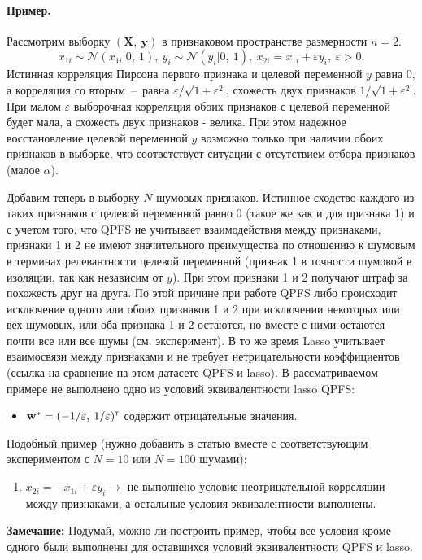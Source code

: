 \documentclass[12pt, a4paper]{article}
\newcommand{\T}{{\text{\tiny\sffamily\upshape\mdseries T}}}
\newcommand{\xmatr}{\mathbf{X}}
\newcommand{\norm}{\mathcal{N}}
\newcommand{\yvec}{\mathbf{y}}
\newcommand{\wvec}{\mathbf{w}}
\begin{document}
\paragraph*{Пример.} Рассмотрим выборку $(\xmatr, \:\yvec)$ в признаковом пространстве размерности $n=2$. 
\begin{equation}
\label{eq:sample_2features}
x_{1i} \sim \norm(x_{1i}|0,\:1),\:y_i\sim \norm(y_i|0,\:1),\:x_{2i} = x_{1i} + \varepsilon y_i,\:\varepsilon > 0.
\end{equation}
Истинная корреляция Пирсона первого признака и целевой переменной $y$ равна 0, а корреляция со вторым~--~равна $\varepsilon / \sqrt{1 + \varepsilon^2}$, схожесть двух признаков $1 / \sqrt{1 + \varepsilon^2}$.   
При малом $\varepsilon$ выборочная корреляция обоих признаков с целевой переменной будет мала, а схожесть двух признаков - велика. При этом надежное восстановление целевой переменной $y$ возможно только при наличии обоих признаков в выборке, что соответствует ситуации с отсутствием отбора признаков (малое $\alpha$).

Добавим теперь в выборку $N$ шумовых признаков. Истинное сходство каждого из таких признаков с целевой переменной равно 0 (такое же как и для признака 1) и с учетом того, что QPFS не учитывает взаимодействия между признаками, признаки 1 и 2 не имеют значительного преимущества по отношению к шумовым в терминах релевантности целевой переменной (признак 1 в точности шумовой в изоляции, так как независим от $y$). При этом признаки 1 и 2 получают штраф за похожесть друг на друга. По этой причине при работе QPFS либо происходит исключение одного или обоих признаков 1 и 2 при исключении некоторых или вех шумовых, или оба признака 1 и 2 остаются, но вместе с ними остаются почти все или все шумы (см. эксперимент). В то же время Lasso учитывает взаимосвязи между признаками и не требует нетрицательности коэффициентов (ссылка на сравнение на этом датасете QPFS и lasso). В рассматриваемом примере не выполнено одно из условий эквивалентности lasso  QPFS:
\begin{itemize}
\item $\wvec^* = (-1 / \varepsilon,\:1 / \varepsilon)^{\T}$ содержит отрицательные значения.
\end{itemize}

Подобный пример (нужно добавить в статью вместе с соответствующим экспериментом с $N=10$ или $N=100$ шумами):
\begin{enumerate}
\item $x_{2i} = -x_{1i} + \varepsilon y_i \to$ не выполнено условие неотрицательной корреляции между признаками, а остальные условия эквивалентности выполнены.
\end{enumerate}
\textbf{Замечание:} Подумай, можно ли построить пример, чтобы все условия кроме одного были выполнены для оставшихся условий эквивалентности QPFS и lasso.
\end{document}
